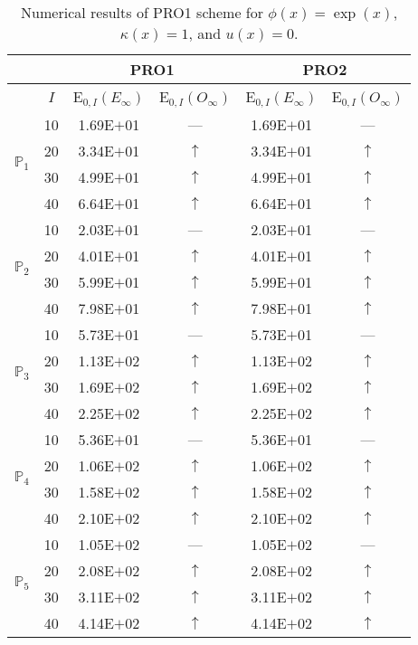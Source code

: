 \begin{table}[H]
\caption{Numerical results of PRO1 scheme for $\phi(x)=\exp(x)$, $\kappa(x)=1$, and $u(x)=0$.}
\setlength{\tabcolsep}{5pt}
\centering
\begin{tabular}{@{}l c c c c c@{}}
\toprule
 &  & \multicolumn{2}{c}{PRO1} & \multicolumn{2}{c}{PRO2}\\
\midrule
 & $I$ & E$_{0,I}(E_{\infty})$ & E$_{0,I}(O_{\infty})$ & E$_{0,I}(E_{\infty})$ & E$_{0,I}(O_{\infty})$\\
\midrule
\multirow{4}{*}{$\mathbb{P}_{1}$}
 & 10 & 1.69E$+$01 & --- & 1.69E$+$01 & ---\\
 & 20 & 3.34E$+$01 & $\uparrow$ & 3.34E$+$01 & $\uparrow$ \\
 & 30 & 4.99E$+$01 & $\uparrow$ & 4.99E$+$01 & $\uparrow$ \\
 & 40 & 6.64E$+$01 & $\uparrow$ & 6.64E$+$01 & $\uparrow$ \\
\midrule
\multirow{4}{*}{$\mathbb{P}_{2}$}
 & 10 & 2.03E$+$01 & --- & 2.03E$+$01 & ---\\
 & 20 & 4.01E$+$01 & $\uparrow$ & 4.01E$+$01 & $\uparrow$ \\
 & 30 & 5.99E$+$01 & $\uparrow$ & 5.99E$+$01 & $\uparrow$ \\
 & 40 & 7.98E$+$01 & $\uparrow$ & 7.98E$+$01 & $\uparrow$ \\
\midrule
\multirow{4}{*}{$\mathbb{P}_{3}$}
 & 10 & 5.73E$+$01 & --- & 5.73E$+$01 & ---\\
 & 20 & 1.13E$+$02 & $\uparrow$ & 1.13E$+$02 & $\uparrow$ \\
 & 30 & 1.69E$+$02 & $\uparrow$ & 1.69E$+$02 & $\uparrow$ \\
 & 40 & 2.25E$+$02 & $\uparrow$ & 2.25E$+$02 & $\uparrow$ \\
\midrule
\multirow{4}{*}{$\mathbb{P}_{4}$}
 & 10 & 5.36E$+$01 & --- & 5.36E$+$01 & ---\\
 & 20 & 1.06E$+$02 & $\uparrow$ & 1.06E$+$02 & $\uparrow$ \\
 & 30 & 1.58E$+$02 & $\uparrow$ & 1.58E$+$02 & $\uparrow$ \\
 & 40 & 2.10E$+$02 & $\uparrow$ & 2.10E$+$02 & $\uparrow$ \\
\midrule
\multirow{4}{*}{$\mathbb{P}_{5}$}
 & 10 & 1.05E$+$02 & --- & 1.05E$+$02 & ---\\
 & 20 & 2.08E$+$02 & $\uparrow$ & 2.08E$+$02 & $\uparrow$ \\
 & 30 & 3.11E$+$02 & $\uparrow$ & 3.11E$+$02 & $\uparrow$ \\
 & 40 & 4.14E$+$02 & $\uparrow$ & 4.14E$+$02 & $\uparrow$ \\
\bottomrule
\end{tabular}
\label{Table:PRO:Test1}
\end{table}
